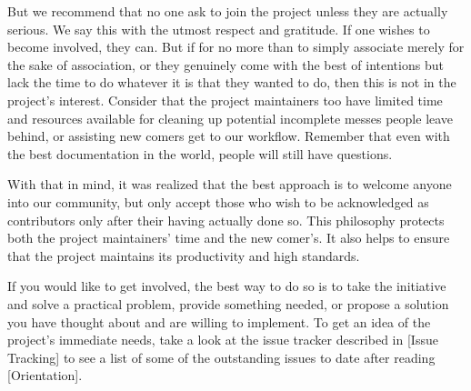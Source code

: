 But we recommend that no one ask to join the project unless they are actually serious. We say this with the utmost respect and gratitude. If one wishes to become involved, they can. But if for no more than to simply associate merely for the sake of association, or they genuinely come with the best of intentions but lack the time to do whatever it is that they wanted to do, then this is not in the project's interest. Consider that the project maintainers too have limited time and resources available for cleaning up potential incomplete messes people leave behind, or assisting new comers get  to our workflow. Remember that even with the best documentation in the world, people will still have questions.

With that in mind, it was realized that the best approach is to welcome anyone into our community, but only accept those who wish to be acknowledged as contributors only after their having actually done so. This philosophy protects both the project maintainers' time and the new comer's. It also helps to ensure that the project maintains its productivity and high standards. 

If you would like to get involved, the best way to do so is to take the initiative and solve a practical problem, provide something needed, or propose a solution you have thought about and are willing to implement. To get an idea of the project's immediate needs, take a look at the issue tracker described in [Issue Tracking] to see a list of some of the outstanding issues to date after reading [Orientation].

